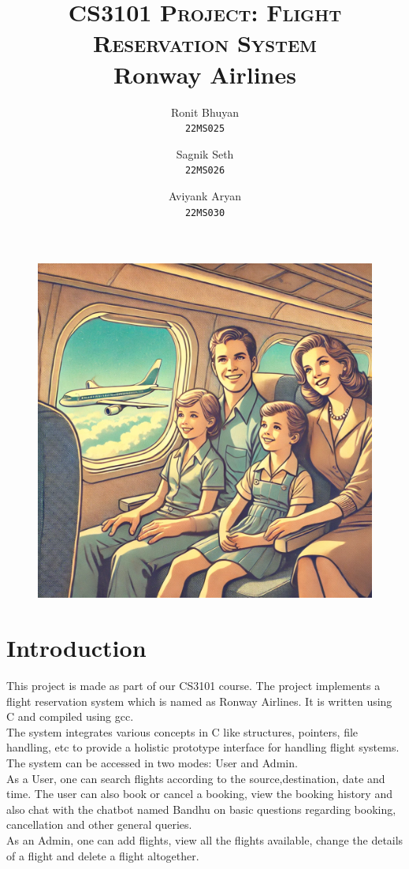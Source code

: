 \documentclass[a4paper]{scrartcl}
\title{
        \Large\textsc{CS3101 Project: Flight Reservation System} \\
        \vspace{10pt}
        \Huge\textbf{Ronway Airlines} \\
}
\author{Ronit Bhuyan \\ \texttt{22MS025} \and Sagnik Seth \\ \texttt{22MS026} \and   Aviyank Aryan \\ \texttt{22MS030}}
\date{}
\begin{document}
\maketitle
\begin{figure}[H]
    \centering
    \includegraphics[scale=0.3]{airplane.jpg}
\end{figure}
\pagebreak
\tableofcontents
\section{Introduction}
This project is made as part of our CS3101 course. The project implements a flight reservation system which is named as Ronway Airlines. It is written using C and compiled using gcc. \\[0.3cm]
The system integrates various concepts in C like structures, pointers, file handling, etc to provide a holistic prototype interface for handling flight systems. \\[0.3cm]
The system can be accessed in two modes: User and Admin.\\[0.3cm]
As a User, one can search flights according to the source,destination, date and time. The user can also book or cancel a booking, view the booking history and also chat with the chatbot named Bandhu on basic questions regarding booking, cancellation and other general queries.\\[0.3cm]
As an Admin, one can add flights, view all the flights available, change the details of a flight and delete a flight altogether.
\end{document}
